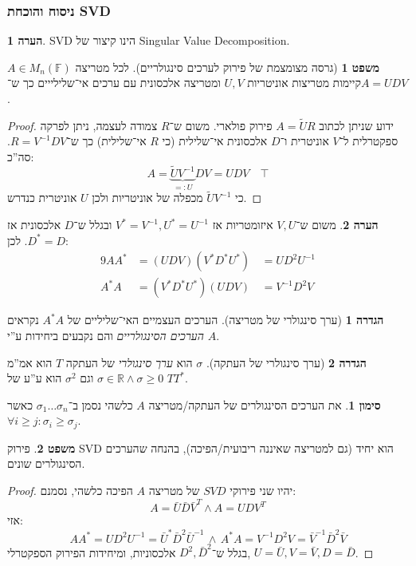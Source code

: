 \documentclass[a4paper]{article}
\newcommand\R     {\mathbb{R}}
\newcommand\F         {\mathbb{F}}
\newcommand\co        {\colon}
\newcommand\sg        {\sigma}
\newcommand\tl    {\tilde}
\newcommand\op    {^{-1}}
\theoremstyle{definition}
\newtheorem{Theorem}{\color{myblue}משפט}
\newtheorem{Definition}{\color{mygreen}הגדרה}
\newtheorem{Remark}{\color{mycyan}הערה}
\newtheorem{Notion}{\color{myred}סימון}
\newcommand\rmark [1] {\begin{Remark}#1\end{Remark}}
\newcommand\noti  [1] {\begin{Notion}#1\end{Notion}}
\begin{document}
	\subsubsection{ניסוח והוכחת SVD}
	\rmark{SVD הינו קיצור של Singular Value Decomposition. }
	\begin{Theorem}[גרסה מצומצמת של פירוק לערכים סינגולריים]
		לכל מטריצה $A \in M_n(\F)$ קיימות מטריצות אוניטריות $U, V$ ומטריצה אלכסונית עם ערכים אי־שלילייים כך ש־$A = UDV$. 
	\end{Theorem}
	\begin{proof}
		ידוע שניתן לכתוב $A = \tl UR$ פירוק פולארי. משום ש־$R$ צמודה לעצמה, ניתן לפרקה ספקטרלית ל־$V$ אוניטרית ו־$D$ אלכסונית אי־שלילית (כי $R$ אי־שלילית) כך ש־$R = V\op DV$. סה''כ: 
		\[ A = \underbrace{\tl UV\op}_{=: U} DV = UDV \quad \top \]
		כי $\tl UV\op$ מכפלה של אוניטריות ולכן $U$ אוניטרית כנדרש. 
	\end{proof}
	
	\rmark{משום ש־$V, U$ איזומטריות אז $V^* = V\op, U^* = U\op$ ובגלל ש־$D$ אלכסונית אז $D^* = D$. לכן: 
		\begin{alignat*}{9}
			AA^* &= (UDV) (V^*D^*U^*)\, &= UD^2U\op \\
			A^*A &= (V^*D^*U^*)(UDV)\, &= V\op D^2 V
	\end{alignat*}}
	
	
	\begin{Definition}[ערך סינגולרי של מטריצה]
		הערכים העצמיים האי־שליליים של $A^*A$ נקראים \textit{הערכים הסינגולריים} והם נקבעים ביחידות ע''י $A$. 
	\end{Definition}
	\begin{Definition}[ערך סינגולרי של העתקה]
		$\sg$ הוא \textit{ערך סינגולרי} של העתקה $T$ הוא אמ''מ $\sg \in \R \land \sg \ge 0$ וגם $\sg^{2}$ הוא ע''ע של $TT^*$. 
	\end{Definition}
	\noti{את הערכים הסינגולרים של העתקה/מטריצה $A$ כלשהי נסמן ב־$\sg_1 \dots \sg_n$ כאשר $\forall i \ge j \co \sg_i \ge \sg_j$. }
	
	\begin{Theorem}
		פירוק SVD הוא יחיד (גם למטריצה שאיננה ריבועית/הפיכה), בהנחה שהערכים הסינגולרים שונים. 
	\end{Theorem}
	\begin{proof}
		יהיו שני פירוקי $SVD$ של מטריצה $A$ הפיכה כלשהי, נסמנם: 
		\[ A = \bar U \bar D \bar V^T \land A = UDV^T \]
		אזי: 
		\[ AA^* = UD^2 U\op = \bar U^* \bar D^2 \bar U\op \,\land\, A^*A = V\op D^2 V = \bar V\op \bar D^2 \bar V \]
		בגלל ש־$D^2, \bar D^2$ אלכסוניות, ומיחידות הפירוק הספקטרלי, $U = \bar U, V = \bar V, D = \bar D$. 
	\end{proof}
	
\end{document}
